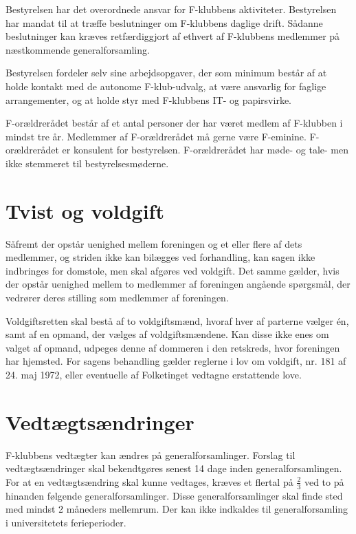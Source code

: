 \documentclass[a4paper,12pt,danish]{article}
\begin{document}
\begin{list}
\item Bestyrelsen har det overordnede ansvar for F-klubbens
  aktiviteter. Bestyrelsen har mandat til at træffe beslutninger om
  F-klubbens daglige drift. Sådanne beslutninger kan kræves
  retfærdiggjort af ethvert af F-klubbens medlemmer på næstkommende
  generalforsamling.

  
\item Bestyrelsen fordeler selv sine arbejdsopgaver, der som minimum
  består af at holde kontakt med de autonome F-klub-udvalg, at
  være ansvarlig for faglige arrangementer, og at holde styr med
  F-klubbens IT- og papirsvirke.


\item F-orældrerådet består af et antal
  personer der har været medlem af F-klubben i mindst tre år.
  Medlemmer af F-orældrerådet må gerne være F-eminine.
  F-orældrerådet er konsulent for bestyrelsen. F-orældrerådet
  har møde- og tale- men ikke stemmeret til bestyrelsesmøderne.

\section{Tvist og voldgift}

\item Såfremt der opstår uenighed mellem foreningen og et
  eller flere af dets medlemmer, og striden ikke kan bilægges ved
  forhandling, kan sagen ikke indbringes for domstole, men skal
  afgøres ved voldgift. Det samme gælder, hvis der opstår
  uenighed mellem to medlemmer af foreningen angående
  spørgsmål, der vedrører deres stilling som medlemmer af
  foreningen. 
  
  Voldgiftsretten skal bestå af to voldgiftsmænd, hvoraf hver
  af parterne vælger \'{e}n, samt af en opmand, der vælges af
  voldgiftsmændene. Kan disse ikke enes om valget af opmand,
  udpeges denne af dommeren i den retskreds, hvor foreningen har
  hjemsted. For sagens behandling gælder reglerne i lov om
  voldgift, nr. 181 af 24. maj 1972, eller eventuelle af Folketinget
  vedtagne erstattende love.

\section{Vedtægtsændringer}
  
\item F-klubbens vedtægter kan ændres på
  generalforsamlinger. Forslag til vedtægtsændringer skal
  bekendtgøres senest 14 dage inden generalforsamlingen. For at en
  vedtægtsændring skal kunne vedtages, kræves et flertal
  på $\frac{2}{3}$ ved to på hinanden følgende
  generalforsamlinger. Disse generalforsamlinger skal finde sted med
  mindst 2 måneders mellemrum.
  Der kan ikke indkaldes til generalforsamling i universitetets ferieperioder.

\end{list}
\end{document}
